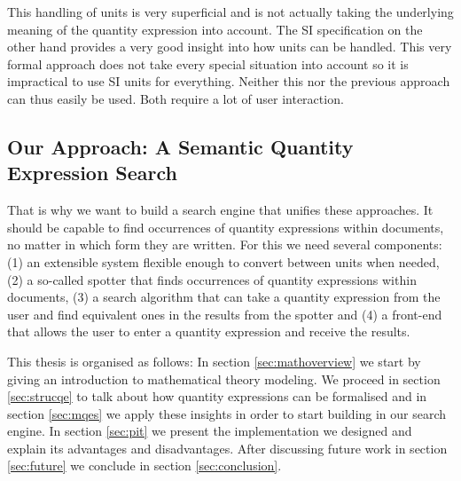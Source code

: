 This handling of units is very superficial and is not actually taking the underlying meaning of the quantity expression into account. The SI specification \cite{sispec} on the other hand provides a very good insight into how units can be handled. This very formal approach does not take every special situation into account so it is impractical to use SI units for everything. Neither this nor the previous approach can thus easily be used. Both require a lot of user interaction.

\subsection{Our Approach: A Semantic Quantity Expression Search}

That is why we want to build a search engine that unifies these approaches. It should be capable to find occurrences of quantity expressions within documents, no matter in which form they are written. For this we need several components: (1) an extensible system flexible enough to convert between units when needed, (2) a so-called spotter that finds occurrences of quantity expressions within documents, (3) a search algorithm that can take a quantity expression from the user and find equivalent ones in the results from the spotter and (4) a front-end that allows the user to enter a quantity expression and receive the results.


This thesis is organised as follows: In section \ref{sec:mathoverview} we start by giving an introduction to mathematical theory modeling. We proceed in section \ref{sec:strucqe} to talk about how quantity expressions can be formalised and in section \ref{sec:mqes} we apply these insights in order to start building in our search engine. In section \ref{sec:pit} we present the implementation we designed and explain its advantages and disadvantages. After discussing future work in section \ref{sec:future} we conclude in section \ref{sec:conclusion}.
